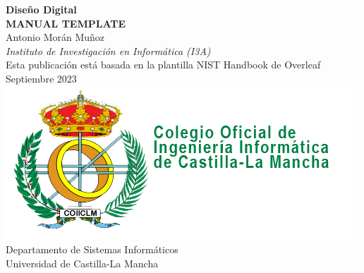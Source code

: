 \begin{titlepage}
\begin{flushright}
\LARGE{\textbf{Diseño Digital}}\\
\vfill 
\Huge{\textbf{MANUAL TEMPLATE}}\\
    \vfill
    \normalsize Antonio Morán Muñoz\\
     \textit{Instituto de Investigación en Informática (I3A)}\\
    \vfill
\normalsize Esta publicación está basada en la plantilla NIST Handbook de Overleaf\\
\vfill
\normalsize Septiembre 2023
\vfill
\includegraphics[width=0.5\linewidth]{figs/logo-cooiiclm.png}\\ 
 \vfill
\footnotesize Departamento de Sistemas Informáticos\\ 
\vspace{10pt}
Universidad de Castilla-La Mancha\\ 
\end{flushright}
\end{titlepage}


